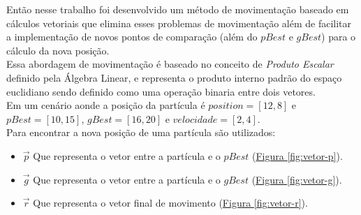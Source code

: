 Então nesse trabalho foi desenvolvido um método de movimentação baseado em cálculos vetoriais que elimina esses problemas de movimentação além de facilitar a implementação de novos pontos de comparação (além do $pBest$ e $gBest$) para o cálculo da nova posição.\\
\indent Essa abordagem de movimentação é baseado no conceito de \textit{Produto Escalar} definido pela Álgebra Linear, e representa o produto interno padrão do espaço euclidiano sendo definido como uma operação binaria entre dois vetores.\\
\noindent Em um cenário aonde a posição da partícula é $position=[12,8]$ e $pBest=[10, 15]$, $gBest=[16,20]$ e $velocidade=[2,4]$.\\
\noindent Para encontrar a nova posição de uma partícula são utilizados:
\begin{itemize}
\item $\vec p$ Que representa o vetor entre a partícula e o $pBest$ 
(\hyperref[fig:vetor-p]{Figura \ref{fig:vetor-p}}).
\item $\vec g$ Que representa o vetor entre a partícula e o $gBest$ 
(\hyperref[fig:vetor-g]{Figura \ref{fig:vetor-g}}).
\item $\vec r$ Que representa o vetor final de movimento
(\hyperref[fig:vetor-r]{Figura \ref{fig:vetor-r}}).
\end{itemize}

